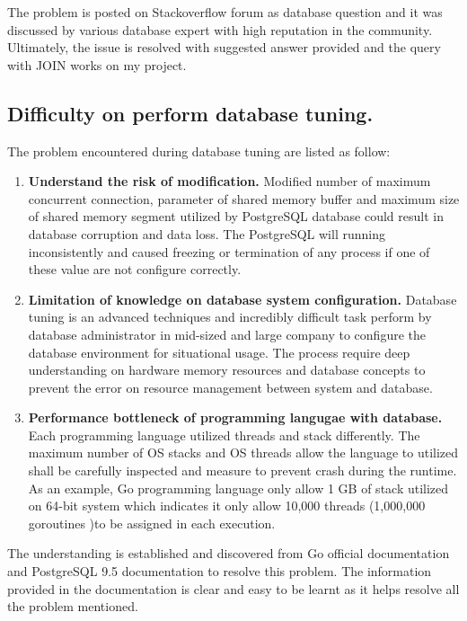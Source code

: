 The problem is posted on Stackoverflow forum as database question and it was discussed by various database expert with high reputation in the community. Ultimately, the issue is resolved with suggested answer provided and the query with JOIN works on my project.

\subsection{Difficulty on perform database tuning.}

The problem encountered during database tuning are listed as follow: 

\begin{enumerate}[topsep=0pt,itemsep=-1ex,partopsep=1ex,parsep=1.5ex]

	\item \textbf{Understand the risk of modification. } Modified number of maximum concurrent connection, parameter of shared memory buffer and maximum size of shared memory segment utilized by PostgreSQL database could result in database corruption and data loss. The PostgreSQL will running inconsistently and caused freezing or termination of any process if one of these value are not configure correctly. 
	
	\item \textbf{Limitation of knowledge on database system configuration.} Database tuning is an advanced techniques and incredibly difficult task perform by database administrator in mid-sized and large company to configure the database environment for situational usage. The process require deep understanding on hardware memory resources and database concepts to prevent the error on resource management between system and database. 
	
	\item \textbf{Performance bottleneck of programming langugae with database. } Each programming language utilized threads and stack differently. The maximum number of OS stacks and OS threads allow the language to utilized shall be carefully inspected and measure to prevent crash during the runtime. As an example, Go programming language only allow 1 GB of stack utilized on 64-bit system which indicates it only allow 10,000 threads (1,000,000 goroutines )to be assigned in each execution.

\end{enumerate}

The understanding is established and discovered from Go official documentation and PostgreSQL 9.5 documentation to resolve this problem. The information provided in the documentation is clear and easy to be learnt as it helps resolve all the problem mentioned. 

